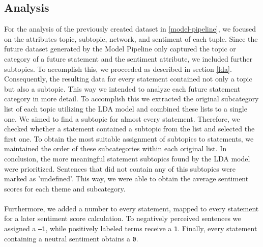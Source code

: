 \subsection{Analysis}
For the analysis of the previously created dataset in \ref{model-pipeline}, we focused on the attributes topic, subtopic, network, and sentiment of each tuple.
Since the future dataset generated by the Model Pipeline only captured the topic or category of a future statement and the sentiment attribute, we included further subtopics.
To accomplish this, we proceeded as described in section \ref{lda}.
Consequently, the resulting data for every statement contained not only a topic but also a subtopic.
This way we intended to analyze each future statement category in more detail.
To accomplish this we extracted the original subcategory list of each topic utilizing the LDA model and combined these lists to a single one. We aimed to find a subtopic for almost every statement.
Therefore, we checked whether a statement contained a subtopic from the list and selected the first one.
To obtain the most suitable assignment of subtopics to statements, we maintained the order of these subcategories within each original list.
In conclusion, the more meaningful statement subtopics found by the LDA model were prioritized. Sentences that did not contain any of this subtopics were marked as 'undefined'.
This way, we were able to obtain the average sentiment scores for each theme and subcategory.
\\
\\
Furthermore, we added a number to every statement, mapped to every statement for a later sentiment score calculation. To negatively perceived sentences we assigned a \texttt{–1}, while positively labeled terms receive a \texttt{1}. Finally, every statement containing a neutral sentiment obtains a \texttt{0}.
